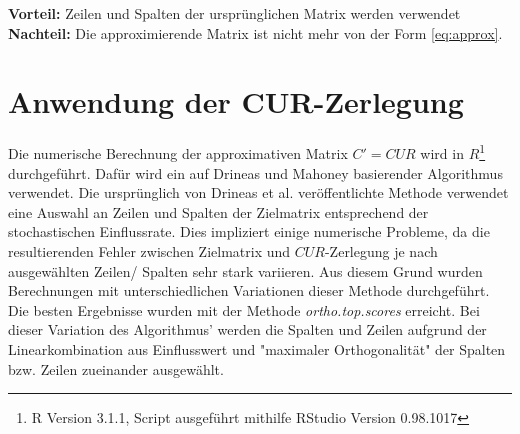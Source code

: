 \documentclass[12pt,a4paper,twoside]{article}
\begin{document}
		\textbf{Vorteil:} Zeilen und Spalten der ursprünglichen Matrix werden verwendet  \newline
		\newline
		\textbf{Nachteil:} Die approximierende Matrix ist nicht mehr von der Form \ref{eq:approx}. \newline
		\newline
\section{Anwendung der CUR-Zerlegung}
	Die numerische Berechnung der approximativen Matrix $C'=CUR$ wird in $R$\footnote{R Version 3.1.1, Script ausgeführt mithilfe RStudio Version 0.98.1017} durchgeführt. Dafür wird ein auf Drineas und Mahoney \citep{mahoney2008} basierender Algorithmus \citep{bodor2012} verwendet. \newline
	Die ursprünglich von Drineas et al. \citep{mahoney2008} veröffentlichte Methode verwendet eine Auswahl an Zeilen 
	und Spalten der Zielmatrix entsprechend der stochastischen Einflussrate. Dies impliziert einige numerische 
	Probleme, da die resultierenden Fehler zwischen Zielmatrix und $CUR$-Zerlegung je nach ausgewählten Zeilen/
	Spalten sehr stark variieren. Aus diesem Grund wurden Berechnungen mit unterschiedlichen Variationen dieser 
	Methode durchgeführt. \newline
	Die besten Ergebnisse wurden mit der Methode \textit{ortho.top.scores} erreicht. Bei dieser Variation des Algorithmus' werden die Spalten und Zeilen aufgrund der Linearkombination aus Einflusswert und "maximaler Orthogonalität" der Spalten bzw. Zeilen zueinander ausgewählt. \\
\end{document}
